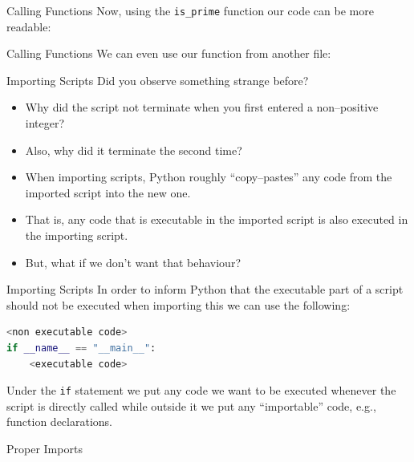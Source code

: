 \documentclass[aspectratio=169, 12pt, xcolor=table]{beamer}
\begin{document}
	\begin{frame}{Calling Functions}
		Now, using the \texttt{is\_prime} function our code can be more readable:
		
	\end{frame}

	\begin{frame}{Calling Functions}
		We can even use our function from another file:
		
	\end{frame}
	
	\begin{headsup}{Importing Scripts}
		Did you observe something strange before?\pause
		\begin{itemize}
			\item Why did the script not terminate when you first entered a non--positive integer?\pause
			\item Also, why did it terminate the second time?\pause
			\item When importing scripts, Python roughly ``copy--pastes'' any code from the imported script into the new one.\pause
			\item That is, any code that is executable in the imported script is also executed in the importing script.\pause
			\item But, what if we don't want that behaviour?
		\end{itemize}
	\end{headsup}

	\begin{frame}[fragile]{Importing Scripts}
		In order to inform Python that the executable part of a script should not be executed when importing this we can use the following:
		\begin{lstlisting}[language=Python]
<non executable code>
if __name__ == "__main__":
    <executable code>
\end{lstlisting}
		Under the \texttt{if} statement we put any code we want to be executed whenever the script is directly called while outside it we put any ``importable'' code, e.g., function declarations.
	\end{frame}

	\begin{frame}{Proper Imports}
		\begin{minipage}[t]{0.5\textwidth}
			\vspace{0pt}
			
		\end{minipage}\hfill
		\begin{minipage}[t]{0.46\textwidth}
			\vspace{0pt}
			
		\end{minipage}
	\end{frame}
\end{document}
